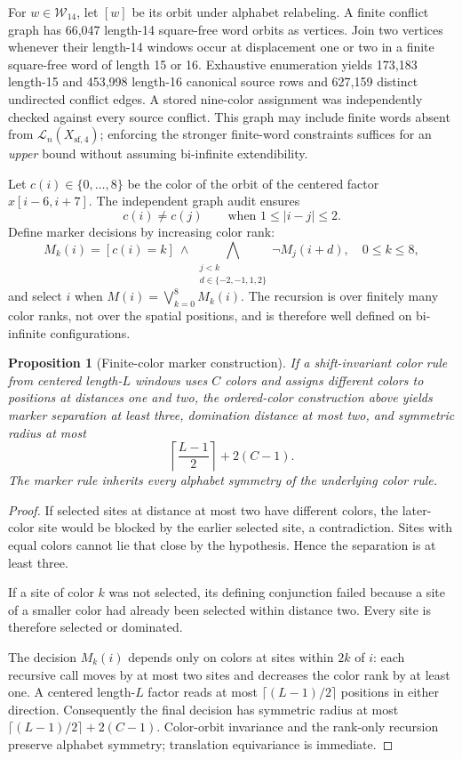 \documentclass[11pt]{article}
\newtheorem{proposition}[theorem]{Proposition}
\theoremstyle{remark}
\newcommand{\Xsf}{X_{\mathrm{sf},4}}
\newcommand{\Lang}{\mathcal{L}}
\begin{document}
For $w\in\mathcal W_{14}$, let $[w]$ be its orbit under
alphabet relabeling. A finite conflict graph has 66,047
length-14 square-free word orbits as vertices. Join two vertices
whenever their length-14 windows occur at displacement one or
two in a finite square-free word of length 15 or 16.
Exhaustive enumeration yields 173,183 length-15 and 453,998
length-16 canonical source rows and 627,159 distinct undirected
conflict edges. A stored nine-color assignment was independently
checked against every source conflict. This graph may include
finite words absent from $\Lang_n(\Xsf)$; enforcing the stronger
finite-word constraints suffices for an \emph{upper} bound without
assuming bi-infinite extendibility.

Let $c(i)\in\{0,\dots,8\}$ be the color of the orbit of the
centered factor $x[i-6,i+7]$. The independent graph audit ensures
\[
       c(i)\ne c(j)\qquad\text{when }1\le |i-j|\le2.
       \tag{*}\label{eq:proper}
\]
Define marker decisions by increasing color rank:
\[
 M_k(i)= [c(i)=k]\ \wedge\
       \bigwedge_{\substack{j<k\\d\in\{-2,-1,1,2\}}}
       \neg M_j(i+d),
       \quad 0\le k\le8,
\]
and select $i$ when $M(i)=\bigvee_{k=0}^8 M_k(i)$.
The recursion is over finitely many color ranks, not over
the spatial positions, and is therefore well defined on
bi-infinite configurations.

\begin{proposition}[Finite-color marker construction]
\label{prop:color}
If a shift-invariant color rule from centered length-$L$
windows uses $C$ colors and assigns different colors to
positions at distances one and two, the ordered-color
construction above yields marker separation at least three,
domination distance at most two, and symmetric radius at most
\[
  \left\lceil\frac{L-1}{2}\right\rceil+2(C-1).
\]
The marker rule inherits every alphabet symmetry of the
underlying color rule.
\end{proposition}

\begin{proof}
If selected sites at distance at most two have different
colors, the later-color site would be blocked by the earlier
selected site, a contradiction. Sites with equal colors
cannot lie that close by the hypothesis. Hence the separation
is at least three.

If a site of color $k$ was not selected, its defining
conjunction failed because a site of a smaller color had
already been selected within distance two. Every site is
therefore selected or dominated.

The decision $M_k(i)$ depends only on colors at sites
within $2k$ of $i$: each recursive call moves by at most two
sites and decreases the color rank by at least one. A
centered length-$L$ factor reads at most
$\lceil(L-1)/2\rceil$ positions in either direction.
Consequently the final decision has symmetric radius
at most $\lceil(L-1)/2\rceil+2(C-1)$. Color-orbit
invariance and the rank-only recursion preserve alphabet
symmetry; translation equivariance is immediate.
\end{proof}
\end{document}
